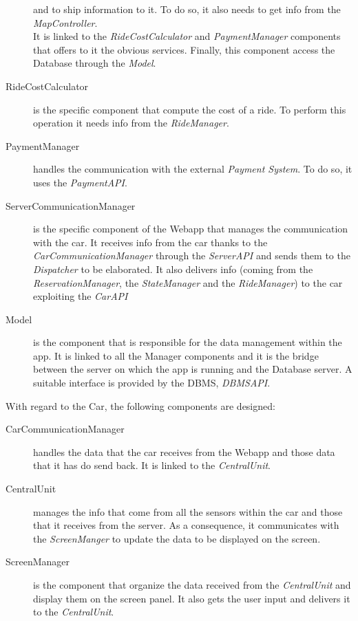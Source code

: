 \documentclass[11pt,a4paper]{report}
\begin{document}
\begin{description}
and to ship information to it. To do so, it also needs to get info from the \textit{MapController}.\\It is linked to the \textit{RideCostCalculator} and \textit{PaymentManager} components that offers to it the obvious services.
Finally, this component access the Database through the \textit{Model}.
\item[RideCostCalculator] is the specific component that compute the cost of a ride. To perform this operation it needs info from the \textit{RideManager}.
\item[PaymentManager] handles the communication with the external \textit{Payment System}. To do so, it uses the \textit{PaymentAPI}.
\item[ServerCommunicationManager] 
is the specific component of the Webapp that manages the communication with the car. It receives info from the car thanks to the \textit{CarCommunicationManager} through the \textit{ServerAPI} and sends them to the \textit{Dispatcher} to be elaborated. It also delivers info (coming from the \textit{ReservationManager}, the \textit{StateManager} and the \textit{RideManager}) to the car exploiting the \textit{CarAPI}
\item[Model] is the component that is responsible for the data management within the app. It is linked to all the Manager components and it is the bridge between the server on which the app is running and the Database server. A suitable interface is provided by the DBMS, \textit{DBMSAPI}.
\end{description}

\noindent With regard to the Car, the following components are designed:
\begin{description}
\item[CarCommunicationManager] handles the data that the car receives from the Webapp and those data that it has do send back. It is linked to the \textit{CentralUnit}.
\item[CentralUnit] manages the info that come from all the sensors within the car and those that it receives from the server. As a consequence, it communicates with the \textit{ScreenManger} to update the data to be displayed on the screen.
\item[ScreenManager] is the component that organize the data received from the \textit{CentralUnit} and display them on the screen panel. It also gets the user input and delivers it to the \textit{CentralUnit}.
\end{description}
\end{document}
